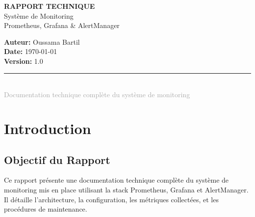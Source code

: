 \documentclass[12pt,a4paper]{report}
\begin{document}
\begin{titlepage}
    \centering
    \vspace*{2cm}
    
    {\Huge\bfseries\color{primaryblue} RAPPORT TECHNIQUE}\\[0.5cm]
    {\LARGE\color{secondaryblue} Système de Monitoring}\\[0.3cm]
    {\Large\color{darkgray} Prometheus, Grafana \& AlertManager}\\[2cm]
    
    
    \vfill
    
    {\Large\textbf{Auteur:} Oussama Bartil}\\[0.3cm]
    {\Large\textbf{Date:} \today}\\[0.3cm]
    {\Large\textbf{Version:} 1.0}\\[2cm]
    
    \textcolor{darkgray}{\rule{\linewidth}{0.5mm}}\\[0.3cm]
    {\large\textcolor{darkgray}{Documentation technique complète du système de monitoring}}
\end{titlepage}

\tableofcontents
\newpage

\chapter{Introduction}

\section{Objectif du Rapport}

Ce rapport présente une documentation technique complète du système de monitoring mis en place utilisant la stack Prometheus, Grafana et AlertManager. Il détaille l'architecture, la configuration, les métriques collectées, et les procédures de maintenance.
\end{document}
